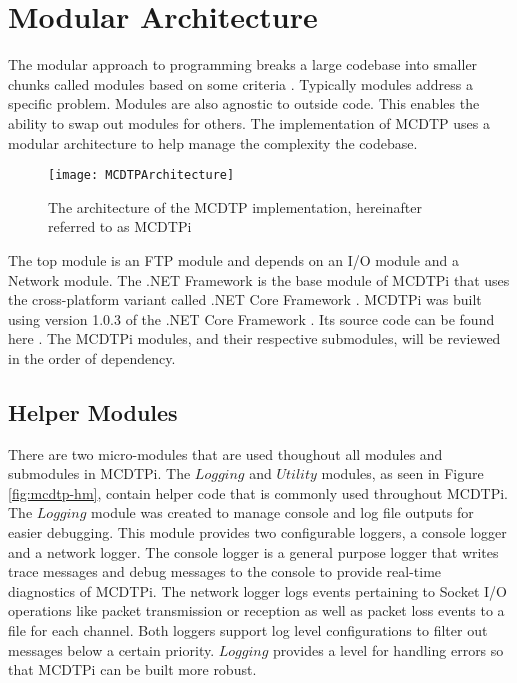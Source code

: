 \section{Modular Architecture}\label{sec:mod-arch}

The modular approach to programming breaks a large codebase into smaller chunks called modules based on some criteria \cite{Microsystems2007}. Typically modules address a specific problem. Modules are also agnostic to outside code. This enables the ability to swap out modules for others. The implementation of MCDTP uses a modular architecture to help manage the complexity the codebase.

\begin{figure}[ht]
\centering
\texttt{[image: MCDTPArchitecture]}
\caption{The architecture of the MCDTP implementation, hereinafter referred to as MCDTPi}
\label{fig:mcdtp-arch}
\end{figure}

The top module is an FTP module and depends on an I/O module and a Network module. The .NET Framework is the base module of MCDTPi that uses the cross-platform variant called .NET Core Framework \cite{netCore10}. MCDTPi was built using version 1.0.3 of the .NET Core Framework \cite{netCore103}. Its source code can be found here \cite{netCore103Src}. The MCDTPi modules, and their respective submodules, will be reviewed in the order of dependency.

\subsection{Helper Modules}

There are two micro-modules that are used thoughout all modules and submodules in MCDTPi. The $Logging$ and $Utility$ modules, as seen in Figure \ref{fig:mcdtp-hm}, contain helper code that is commonly used throughout MCDTPi. The $Logging$ module was created to manage console and log file outputs for easier debugging. This module provides two configurable loggers, a console logger and a network logger. The console logger is a general purpose logger that writes trace messages and debug messages to the console to provide real-time diagnostics of MCDTPi. The network logger logs events pertaining to Socket I/O operations like packet transmission or reception as well as packet loss events to a file for each channel. Both loggers support log level configurations to filter out messages below a certain priority. $Logging$ provides a level for handling errors so that MCDTPi can be built more robust.

